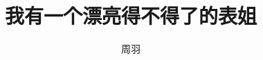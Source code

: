 ﻿\documentclass[11pt]{article}
\begin{document}
\title{我有一个漂亮得不得了的表姐}
\author{周羽}
\maketitle
\tableofcontents
\end{document}
